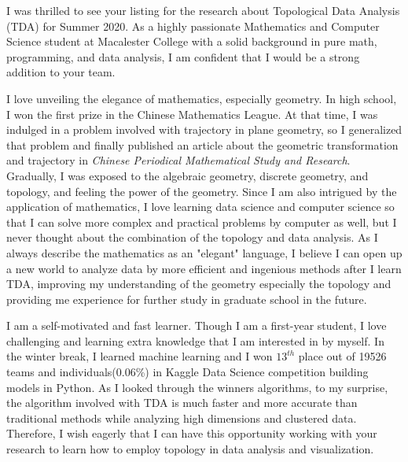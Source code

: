 \documentclass[11pt, a4paper]{awesome-cv}
\begin{document}
\makecvheader[L]


\makelettertitle

\begin{cvletter}

I was thrilled to see your listing for the research about Topological Data Analysis (TDA) for Summer 2020. As a highly passionate Mathematics and Computer Science student at Macalester College with a solid background in pure math, programming, and data analysis, I am confident that I would be a strong addition to your team.

I love unveiling the elegance of mathematics, especially geometry. In high school, I won the first prize in the Chinese Mathematics League. At that time, I was indulged in a problem involved with trajectory in plane geometry, so I generalized that problem and finally published an article about the geometric transformation and trajectory in \textit{Chinese Periodical Mathematical Study and Research}. Gradually, I was exposed to the algebraic geometry, discrete geometry, and topology, and feeling the power of the geometry. Since I am also intrigued by the application of mathematics, I love learning data science and computer science so that I can solve more complex and practical problems by computer as well, but I never thought about the combination of the topology and data analysis. As I always describe the mathematics as an "elegant" language, I believe I can open up a new world to analyze data by more efficient and ingenious methods after I learn TDA, improving my understanding of the geometry especially the topology and providing me experience for further study in graduate school in the future. 

I am a self-motivated and fast learner. Though I am a first-year student, I love challenging and learning extra knowledge that I am interested in by myself. In the winter break, I learned machine learning and I won $13^{th}$ place out of 19526 teams and individuals(0.06\%) in Kaggle Data Science competition building models in Python. As I looked through the winners algorithms, to my surprise, the algorithm involved with TDA is much faster and more accurate than traditional methods while analyzing high dimensions and clustered data. Therefore, I wish eagerly that I can have this opportunity working with your research to learn how to employ topology in data analysis and visualization.


\end{cvletter}
\end{document}

